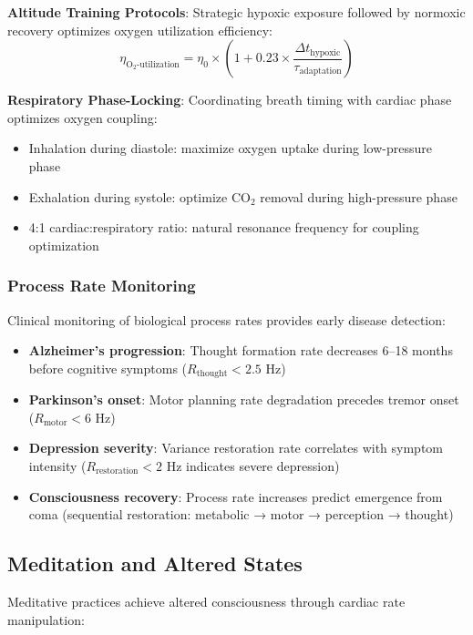 \documentclass[12pt]{article}
\theoremstyle{remark}
\begin{document}
\textbf{Altitude Training Protocols}: Strategic hypoxic exposure followed by normoxic recovery optimizes oxygen utilization efficiency:
\begin{equation}
\eta_{\text{O}_2\text{-utilization}} = \eta_0 \times \left(1 + 0.23 \times \frac{\Delta t_{\text{hypoxic}}}{\tau_{\text{adaptation}}}\right)
\end{equation}

\textbf{Respiratory Phase-Locking}: Coordinating breath timing with cardiac phase optimizes oxygen coupling:
\begin{itemize}
\item Inhalation during diastole: maximize oxygen uptake during low-pressure phase
\item Exhalation during systole: optimize CO$_2$ removal during high-pressure phase
\item 4:1 cardiac:respiratory ratio: natural resonance frequency for coupling optimization
\end{itemize}

\subsubsection{Process Rate Monitoring}

Clinical monitoring of biological process rates provides early disease detection:

\begin{itemize}
\item \textbf{Alzheimer's progression}: Thought formation rate decreases 6--18 months before cognitive symptoms ($R_{\text{thought}} < 2.5$ Hz)
\item \textbf{Parkinson's onset}: Motor planning rate degradation precedes tremor onset ($R_{\text{motor}} < 6$ Hz)
\item \textbf{Depression severity}: Variance restoration rate correlates with symptom intensity ($R_{\text{restoration}} < 2$ Hz indicates severe depression)
\item \textbf{Consciousness recovery}: Process rate increases predict emergence from coma (sequential restoration: metabolic → motor → perception → thought)
\end{itemize}

\subsection{Meditation and Altered States}

Meditative practices achieve altered consciousness through cardiac rate manipulation:
\end{document}
